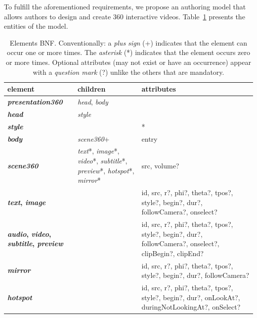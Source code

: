To fulfill the aforementioned requirements, we propose an authoring model that allows authors to design and create 360 interactive videos. Table~\ref{tbl:entities} presents the entities of the model.
\begin{table}[!ht]
\footnotesize
\begin{tabularx}{\linewidth}{ p{3cm} p{4cm} X }
\hline

\textbf{element} & \textbf{children} & \textbf{attributes}\\ \hline

\textbf{\emph{presentation360}}  & \emph{head}, \emph{\emph{body}} &  \\ \hline

\textbf{\emph{head}}  & \emph{style} &  \\  \hline

\textbf{\emph{style}}  &  & * \\  \hline

\textbf{\emph{body}}  & \emph{scene360}+ & entry \\ \hline

\textbf{\emph{scene360}}  & \emph{text}*, \emph{image}*, \emph{video}*,
\emph{subtitle}*, \emph{preview}*, \emph{hotspot}*, \emph{mirror}* & src, volume? \\  \hline

\textbf{\emph{text}, \emph{image}}  &  & 
id, src, r?, phi?, theta?, tpos?, style?, begin?, dur?, followCamera?, onselect? \\ \hline

\textbf{\emph{audio}, \emph{video}, \emph{subtitle}, \emph{preview}}  &  & 
id, src, r?, phi?, theta?, tpos?, style?, begin?, dur?, followCamera?, onselect?, clipBegin?, clipEnd?\\ \hline

\textbf{\emph{mirror}}  &  & 
id, src, r?, phi?, theta?, tpos?, style?, begin?, dur?, 
followCamera? \\ \hline

\textbf{\emph{hotspot}}  &  & 
id, src, r?, phi?, theta?, tpos?, 
style?, begin?, dur?,  onLookAt?, duringNotLookingAt?, onSelect? \\ \hline

\hline
 \end{tabularx}
\caption{Elements BNF. Conventionally: a \emph{plus sign} (+) indicates that the element can occur one or more times. The \emph{asterisk} (*) indicates that the element occurs zero or more times. Optional attributes (may not exist or have an occurrence) appear with a \emph{question mark} (?) unlike the others that are mandatory. 
}
\label{tbl:entities}
\end{table}

